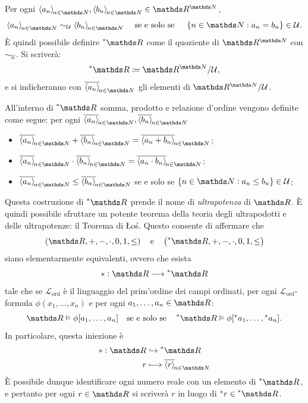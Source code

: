 Per ogni \mbox{$ \sequence{a_{n}}, \sequence{b_{n} } \in \R^{\N} $}, \begin{equation*}
    \sequence{a_{n} }\mathrel{\sim_{\mathcal{U}} }\sequence{b_{n} }\quad\text{ se e solo se }\quad\set{ n \in \N: a_{n}=b_{n}  } \in \mathcal{U}.
\end{equation*}È quindi possibile definire $ \starR $ come il quoziente di $ \R^{\N} $ con $ \sim_{\mathcal{U}}  $. Si scriverà: \begin{equation*}
    \starR \coloneqq \R^{\N}/\mathcal{U},
\end{equation*}e si indicheranno con $ \filtersequence{a_{n}} $ gli elementi di $ \R^{\N}/\mathcal{U} $. 

All'interno di $ \starR $ somma, prodotto e relazione d'ordine vengono definite come segue: per ogni $ \filtersequence{a_{n}}, \filtersequence{b_{n}} $ \begin{itemize}
    \item $ \displaystyle \filtersequence{a_{n}} + \filtersequence{b_{n}} = \filtersequence{a_{n} + b_{n} } $;
    \item $ \displaystyle \filtersequence{a_{n}} \cdot  \filtersequence{b_{n}} = \filtersequence{a_{n} \cdot  b_{n} }$;
    \item $ \displaystyle \filtersequence{a_{n}} \le \filtersequence{b_{n}} $ se e solo se $ \set{ n\in \N: a_{n}\le b_{n}  } \in \mathcal{U} $;
\end{itemize}

Questa costruzione di $ \starR $ prende il nome di \emph{ultrapotenza} di $ \R $. È quindi possibile sfruttare un potente teorema della teoria degli ultrapodotti e delle ultrapotenze: il Teorema di Łoś. Questo consente di affermare che \begin{equation*}
    \left(\R,+,-,\cdot , 0,1,\le \right)\quad\text{e}\quad\left(\starR,+,-,\cdot , 0,1,\le \right)
\end{equation*}siano elementarmente equivalenti, ovvero che esista \begin{equation*}
    *: \R \longrightarrow \starR
\end{equation*}tale che se $ \mathcal{L}_{\text{ord}} $ è il linguaggio del prim'ordine dei campi ordinati, per ogni $ \mathcal{L}_{\text{ord}} $-formula $ \phi(x_1,\dots,x_{n} ) $ e per ogni $ a_1,\dots,a_{n} \in \R  $: \begin{equation*}
    \R\vDash\phi[a_1,\dots,a_{n} ]\quad\text{se e solo se}\quad \starR\vDash\phi[\nonstandard{a_1},\dots,\nonstandard{a_{n} }].
\end{equation*}In particolare, questa iniezione è \begin{align*}
* :\R  &\hookrightarrow\starR \\
r &\longmapsto \filtersequence{r}
\end{align*}È possibile dunque identificare ogni numero reale con un elemento di $ \starR $, e pertanto per ogni $ r \in \R $ si scriverà $ r $ in luogo di $ \nonstandard{r} \in \starR $. 

